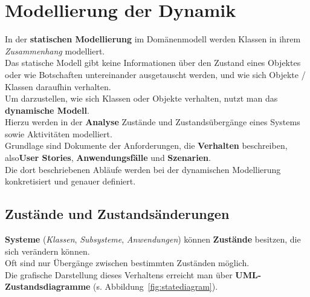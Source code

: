 \section{Modellierung der Dynamik}

\noindent
In der \textbf{statischen Modellierung} im Domänenmodell werden Klassen in ihrem \textit{Zusammenhang} modelliert.\\

\noindent
Das statische Modell gibt keine Informationen über den Zustand eines Objektes oder wie Botschaften untereinander ausgetauscht werden, und wie sich Objekte / Klassen daraufhin verhalten.\\

\noindent
Um darzustellen, wie sich Klassen oder Objekte verhalten, nutzt man das \textbf{dynamische Modell}.\\

\noindent
Hierzu werden in der \textbf{Analyse} Zustände und Zustandsübergänge eines Systems sowie Aktivitäten modelliert.\\
Grundlage sind Dokumente der Anforderungen, die \textbf{Verhalten} beschreiben, also\textbf{User Stories}, \textbf{Anwendungsfälle} und \textbf{Szenarien}.\\
Die dort beschriebenen Abläufe werden bei der dynamischen Modellierung konkretisiert und genauer definiert.

\subsection*{Zustände und Zustandsänderungen}
\textbf{Systeme} (\textit{Klassen}, \textit{Subsysteme}, \textit{Anwendungen}) können \textbf{Zustände} besitzen, die sich verändern können.\\

\noindent
Oft sind nur Übergänge zwischen bestimmten Zuständen möglich.\\

\noindent
Die grafische Darstellung dieses Verhaltens erreicht man über \textbf{UML-Zustandsdiagramme} (s. Abbildung~\ref{fig:statediagram}).

